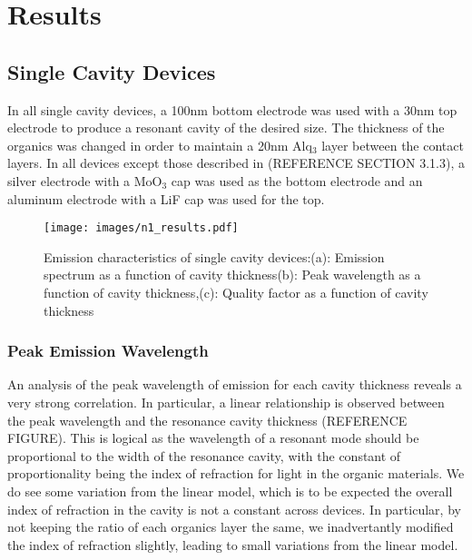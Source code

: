 \documentclass{report}
\begin{document}
\chapter{Results}

    \section{Single Cavity Devices}
    
        In all single cavity devices, a 100nm bottom electrode was used with a 30nm top electrode to produce a resonant cavity of the desired size. The thickness of the organics was changed in order to maintain a 20nm Alq$_3$ layer between the contact layers. In all devices except those described in (REFERENCE SECTION 3.1.3), a silver electrode with a MoO$_3$ cap was used as the bottom electrode and an aluminum electrode with a LiF cap was used for the top.
        
        \begin{figure}
            \centering
            \vspace{-1cm}
            \texttt{[image: images/n1\_results.pdf]}
            \vspace{-1cm}
            \caption{Emission characteristics of single cavity devices:\newline (a): Emission spectrum as a function of cavity thickness\newline (b): Peak wavelength as a function of cavity thickness,\newline (c): Quality factor as a function of cavity thickness}
        \end{figure}

    
        \subsection{Peak Emission Wavelength}
            An analysis of the peak wavelength of emission for each cavity thickness reveals a very strong correlation. In particular, a linear relationship is observed between the peak wavelength and the resonance cavity thickness (REFERENCE FIGURE). This is logical as the wavelength of a resonant mode should be proportional to the width of the resonance cavity, with the constant of proportionality being the index of refraction for light in the organic materials. We do see some variation from the linear model, which is to be expected the overall index of refraction in the cavity is not a constant across devices. In particular, by not keeping the ratio of each organics layer the same, we inadvertantly modified the index of refraction slightly, leading to small variations from the linear model.
            
\end{document}
